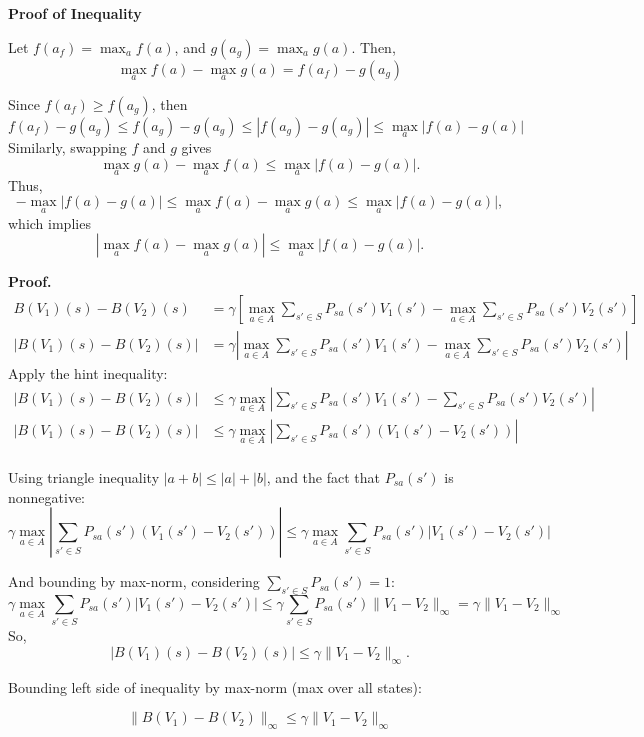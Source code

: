 \begin{answer}

\textbf{Proof of Inequality}

Let $f(a_f) = \max_a f(a)$, and $g(a_g) = \max_a g(a)$. Then,
\[
\max_a f(a) - \max_a g(a) = f(a_f) - g(a_g)
\]

Since $f(a_f) \geq f(a_g)$, then
\[
f(a_f) - g(a_g) \leq f(a_g) - g(a_g) \leq | f(a_g) - g(a_g) | \leq \max_a | f(a) - g(a) |
\]
Similarly, swapping $f$ and $g$ gives
\[
\max_a g(a) - \max_a f(a) \le \max_a |f(a) - g(a)|.
\]
Thus,
\[
-\max_a |f(a) - g(a)| 
\le \max_a f(a) - \max_a g(a) 
\le \max_a |f(a) - g(a)|,
\]
which implies
\[
\left|\max_a f(a) - \max_a g(a)\right| 
\le \max_a |f(a) - g(a)|.
\]

\textbf{Proof.}
\[
\begin{aligned}
B(V_1)(s) - B(V_2)(s) &= \gamma \left[ \max_{a\in A} \sum_{s'\in S} P_{sa}(s') V_1(s') - \max_{a\in A} \sum_{s'\in S} P_{sa}(s') V_2(s')\right] \\
| B(V_1)(s) - B(V_2)(s) | &= \gamma \left| \max_{a\in A} \sum_{s'\in S} P_{sa}(s') V_1(s') - \max_{a\in A} \sum_{s'\in S} P_{sa}(s') V_2(s')\right|
\end{aligned}
\]
Apply the hint inequality:
\[
\begin{align*}
   |B(V_1)(s) - B(V_2)(s)| &\leq  \gamma \max_{a\in A} \left| \sum_{s'\in S} P_{sa}(s') V_1(s') - \sum_{s'\in S} P_{sa}(s') V_2(s')\right| \\
   |B(V_1)(s) - B(V_2)(s)| &\leq  \gamma \max_{a\in A} \left| \sum_{s'\in S} P_{sa}(s') ( V_1(s') - V_2(s')) \right|\\
\end{align*}
\]

Using triangle inequality $|a + b| \leq |a| + |b|$, and the fact that $P_{sa}(s')$ is nonnegative:
\[
\gamma \max_{a\in A} \left| \sum_{s'\in S} P_{sa}(s') (V_1(s') - V_2(s')) \right| \leq \gamma \max_{a\in A} \sum_{s'\in S} P_{sa}(s') |  V_1(s') - V_2(s') |
\]

And bounding by max-norm, considering $\sum_{s'\in S} P_{sa}(s') =1$:
\[
\gamma \max_{a\in A} \sum_{s'\in S} P_{sa}(s') |  V_1(s') - V_2(s') | \leq \gamma \sum_{s'\in S} P_{sa}(s') \| V_1 - V_2 \|_\infty = \gamma \| V_1 - V_2 \|_\infty
\]
So,
\[
|B(V_1)(s) - B(V_2)(s)| \leq \gamma \| V_1 - V_2 \|_\infty.
\]

Bounding left side of inequality by max-norm (max over all states):

\[
\boxed{
\|B(V_1) - B(V_2)\|_\infty \leq \gamma \| V_1 - V_2 \|_\infty
}
\]


\end{answer}
